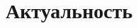 \section{Актуальность}

\begin{frame}
\frametitle{\insertsection} 
\framesubtitle{\insertsubsection}


\end{frame}
